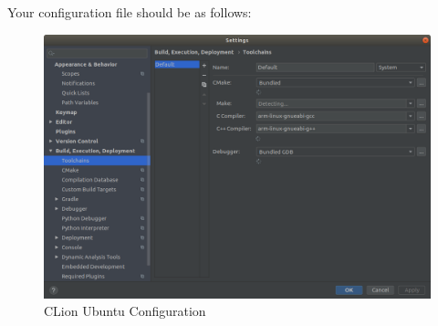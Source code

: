 Your configuration file should be as follows:
\begin{figure}[H]
\centering
\includegraphics[width=0.8\columnwidth]{Figures/UbuntuCLionConfig}
\caption{CLion Ubuntu Configuration}
\label{fig:UbuntuCLionConfig}
\end{figure}